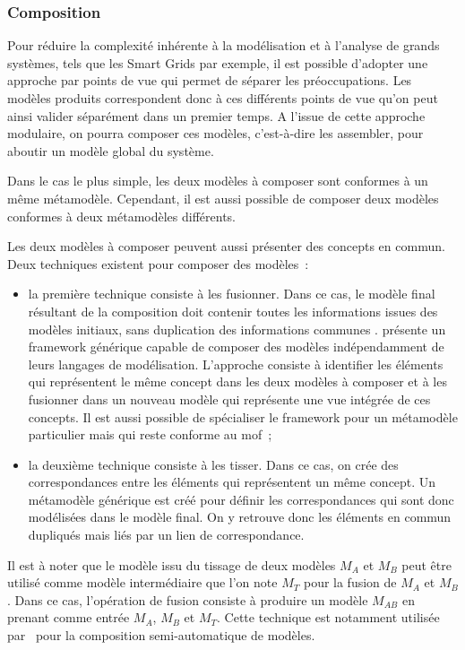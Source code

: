 \subsubsection{Composition}

Pour réduire la complexité inhérente à la modélisation et à l'analyse de grands 
systèmes, tels que les Smart Grids par exemple, il est possible d'adopter une 
approche par points de vue qui permet de séparer les préoccupations. Les modèles 
produits correspondent donc à ces différents points de vue qu'on peut ainsi 
valider séparément dans un premier temps. A l'issue de cette approche modulaire, 
on pourra composer ces modèles, c'est-à-dire les assembler, pour aboutir un 
modèle global du système.

Dans le cas le plus simple, les deux modèles à composer sont conformes à un même 
métamodèle. Cependant, il est aussi possible de composer deux modèles conformes 
à deux métamodèles différents. 

Les deux modèles à composer peuvent aussi présenter des concepts en commun. Deux 
techniques existent pour composer des modèles~:

\begin{itemize}
\item la première technique consiste à les fusionner. Dans ce cas, le modèle 
final résultant de la composition doit contenir toutes les informations issues 
des modèles initiaux, sans duplication des informations communes 
\cite{bezivin2006canonical}.
\cite{fleurey2008generic} présente un framework générique capable de composer 
des modèles indépendamment de leurs langages de modélisation. L'approche 
consiste à identifier les éléments qui représentent le même concept dans les 
deux modèles à composer et à les fusionner dans un nouveau modèle qui représente 
une vue intégrée de ces concepts. Il est aussi possible de spécialiser le 
framework pour un métamodèle particulier mais qui reste conforme au \gls{mof}~;

\item la deuxième technique consiste à les tisser. Dans ce cas, on crée des 
correspondances entre les éléments qui représentent un même concept. Un 
métamodèle générique est créé pour définir les correspondances qui sont donc 
modélisées dans le modèle final. On y retrouve donc les éléments en commun 
dupliqués mais liés par un lien de correspondance. 
\end{itemize}

Il est à noter que le modèle issu du tissage de deux modèles $M_{A}$ et $M_{B}$ 
peut être utilisé comme modèle intermédiaire que l'on note $M_{T}$ pour la 
fusion de $M_{A}$ et $M_{B}$. Dans ce cas, l'opération de fusion consiste à 
produire un modèle $M_{AB}$ en prenant comme entrée $M_{A}$, $M_{B}$ et $M_{T}$. 
Cette technique est notamment utilisée par~\cite{del2007semi} pour la 
composition semi-automatique de modèles.


